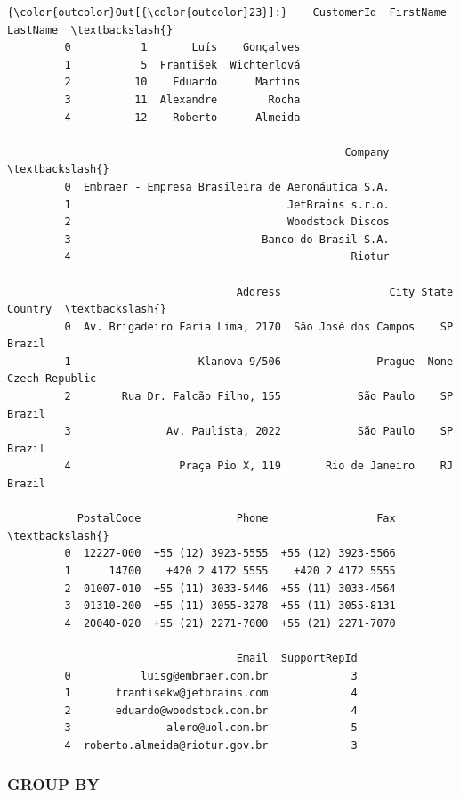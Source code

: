 \documentclass[11pt]{article}
\begin{document}
\begin{Verbatim}[commandchars=\\\{\}]
{\color{outcolor}Out[{\color{outcolor}23}]:}    CustomerId  FirstName     LastName  \textbackslash{}
         0           1       Luís    Gonçalves   
         1           5  František  Wichterlová   
         2          10    Eduardo      Martins   
         3          11  Alexandre        Rocha   
         4          12    Roberto      Almeida   
         
                                                     Company  \textbackslash{}
         0  Embraer - Empresa Brasileira de Aeronáutica S.A.   
         1                                  JetBrains s.r.o.   
         2                                  Woodstock Discos   
         3                              Banco do Brasil S.A.   
         4                                            Riotur   
         
                                    Address                 City State         Country  \textbackslash{}
         0  Av. Brigadeiro Faria Lima, 2170  São José dos Campos    SP          Brazil   
         1                    Klanova 9/506               Prague  None  Czech Republic   
         2        Rua Dr. Falcão Filho, 155            São Paulo    SP          Brazil   
         3               Av. Paulista, 2022            São Paulo    SP          Brazil   
         4                 Praça Pio X, 119       Rio de Janeiro    RJ          Brazil   
         
           PostalCode               Phone                 Fax  \textbackslash{}
         0  12227-000  +55 (12) 3923-5555  +55 (12) 3923-5566   
         1      14700    +420 2 4172 5555    +420 2 4172 5555   
         2  01007-010  +55 (11) 3033-5446  +55 (11) 3033-4564   
         3  01310-200  +55 (11) 3055-3278  +55 (11) 3055-8131   
         4  20040-020  +55 (21) 2271-7000  +55 (21) 2271-7070   
         
                                    Email  SupportRepId  
         0           luisg@embraer.com.br             3  
         1       frantisekw@jetbrains.com             4  
         2       eduardo@woodstock.com.br             4  
         3               alero@uol.com.br             5  
         4  roberto.almeida@riotur.gov.br             3  
\end{Verbatim}
            
    \hypertarget{group-by}{%
\subsubsection{GROUP BY}\label{group-by}}
\end{document}
